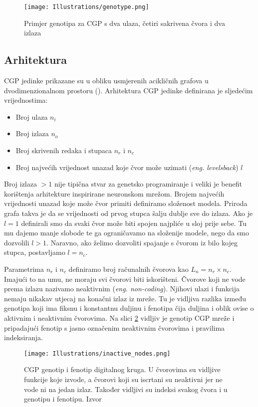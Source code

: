 \begin{figure}
	\centering
	\texttt{[image: Illustrations/genotype.png]}
	\caption{Primjer genotipa za CGP s dva ulaza, četiri sakrivena čvora i dva izlaza}
	\label{fig:genotype}
\end{figure}

\subsection{Arhitektura}
CGP jedinke prikazane su u obliku usmjerenih acikličnih grafova u dvodimenzionalnom prostoru (\cite{cgp}).
Arhitektura CGP jedinke definirana je sljedećim vrijednostima:
\begin{itemize}
	\item Broj ulaza $n_i$
	\item Broj izlaza $n_o$
	\item Broj skrivenih redaka i stupaca $n_r$ i $n_c$
	\item Broj najvećih vrijednost unazad koje čvor može uzimati (\emph{eng. levelsback}) $l$
\end{itemize}
Broj izlaza $>1$ nije tipična stvar za genetsko programiranje i veliki je benefit korištenja arhitekture inspirirane neuronskom mrežom.
Brojem najvećih vrijednosti unazad koje može čvor primiti definiramo složenost modela.
Priroda grafa takva je da se vrijednosti od prvog stupca šalju dublje sve do izlaza.
Ako je $l = 1$ definirali smo da svaki čvor može biti spojen najpliće u sloj prije sebe.
Tu mu dajemo manje slobode te ga ograničavamo na složenije modele, nego da smo dozvolili $l > 1$.
Naravno, ako želimo dozvoliti spajanje s čvorom iz bilo kojeg stupca, postavljamo  $l=n_c$.

Parametrima $n_r$ i $n_c$ definiramo broj računalnih čvorova kao $L_n = n_r \times n_c$.
Imajući to na umu, ne moraju svi čvorovi biti iskorišteni.
Čvorove koji ne vode prema izlazu nazivamo neaktivnim (\emph{eng. non-coding}).
Njihovi ulazi i funkcija nemaju nikakav utjecaj na konačni izlaz iz mreže.
Tu je vidljiva razlika između genotipa koji ima fiksnu i konstantnu duljinu i fenotipa čija duljina i oblik ovise o aktivnim i neaktivnim čvorovima.
Na slici \ref{fig:cgp_gene_feno} vidljiv je genotip CGP mreže i pripadajući fenotip s jasno označenim neaktivnim čvorovima i pravilima indeksiranja.

\begin{figure}
	\centering
	\texttt{[image: Illustrations/inactive\_nodes.png]}
	\caption{CGP genotip i fenotip digitalnog kruga. U čvorovima su vidljive funkcije koje izvode, a čvorovi koji su iscrtani su neaktivni jer ne vode ni na jedan izlaz. Također vidljivi su indeksi svakog čvora i u genotipu i fenotipu. Izvor \cite{cgp}}
	\label{fig:cgp_gene_feno}
\end{figure}

